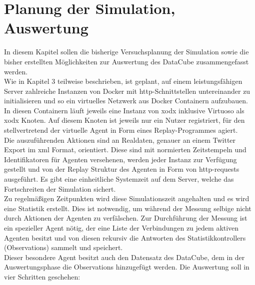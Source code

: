 \documentclass{article}
\begin{document}
\section{Planung der Simulation, Auswertung}

In diesem Kapitel sollen die bisherige Versuchsplanung der Simulation sowie die bisher erstellten Möglichkeiten zur Auswertung des DataCube zusammengefasst werden.\\
Wie in Kapitel 3 teilweise beschrieben, ist geplant, auf einem leistungsfähigen Server zahlreiche Instanzen von Docker mit http-Schnittstellen untereinander zu initialisieren und so ein virtuelles Netzwerk aus Docker Containern aufzubauen. In diesen Containern läuft jeweils eine Instanz von xodx inklusive Virtuoso als xodx Knoten. Auf diesem Knoten ist jeweils nur ein Nutzer registriert, für den stellvertretend der virtuelle Agent in Form eines Replay-Programmes agiert.\\
Die auszuführenden Aktionen sind an Realdaten, genauer an einem Twitter Export im xml Format, orientiert. Diese sind mit normierten Zeitstempeln und Identifikatoren für Agenten versehenen, werden jeder Instanz zur Verfügung gestellt und von der Replay Struktur des Agenten in Form von http-requests ausgeführt. Es gibt eine einheitliche Systemzeit auf dem Server, welche das Fortschreiten der Simulation sichert.\\
Zu regelmäßigen Zeitpunkten wird diese Simulationszeit angehalten und es wird eine Statistik erstellt. Dies ist notwendig, um während der Messung selbige nicht durch Aktionen der Agenten zu verfälschen. Zur Durchführung der Messung ist ein spezieller Agent nötig, der eine Liste der Verbindungen zu jedem aktiven Agenten besitzt und von diesen rekursiv die Antworten des Statistikkontrollers (Observations) sammelt und speichert.\\
Dieser besondere Agent besitzt auch den Datensatz des DataCube, dem in der Auswertungsphase die Observations hinzugefügt werden. Die Auswertung soll in vier Schritten geschehen:
\end{document}
